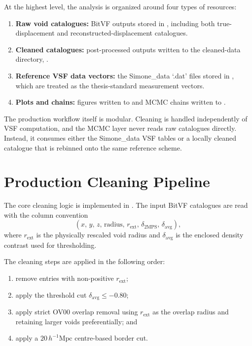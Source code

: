 \documentclass[12pt]{report}
\begin{document}
At the highest level, the analysis is organized around four types of resources:
\begin{enumerate}
    \item \textbf{Raw void catalogues:} BitVF outputs stored in , including both true-displacement and reconstructed-displacement catalogues.
    \item \textbf{Cleaned catalogues:} post-processed outputs written to the cleaned-data directory, .
    \item \textbf{Reference VSF data vectors:} the Simone\_data `.dat' files stored in , which are treated as the thesis-standard measurement vectors.
    \item \textbf{Plots and chains:} figures written to  and MCMC chains written to .
\end{enumerate}

The production workflow itself is modular. Cleaning is handled independently of VSF computation, and the MCMC layer never reads raw catalogues directly. Instead, it consumes either the Simone\_data VSF tables or a locally cleaned catalogue that is rebinned onto the same reference scheme.

\section{Production Cleaning Pipeline}

The core cleaning logic is implemented in . The input BitVF catalogues are read with the column convention
\begin{equation}
    (x,\,y,\,z,\,\mathrm{radius},\,r_\mathrm{ext},\,\delta_{2\mathrm{MPS}},\,\delta_\mathrm{avg}),
\end{equation}
where $r_\mathrm{ext}$ is the physically rescaled void radius and $\delta_\mathrm{avg}$ is the enclosed density contrast used for thresholding.

The cleaning steps are applied in the following order:
\begin{enumerate}
    \item remove entries with non-positive $r_\mathrm{ext}$;
    \item apply the threshold cut $\delta_\mathrm{avg}\leq -0.80$;
    \item apply strict OV00 overlap removal using $r_\mathrm{ext}$ as the overlap radius and retaining larger voids preferentially; and
    \item apply a $20\,h^{-1}\mathrm{Mpc}$ centre-based border cut.
\end{enumerate}
\end{document}
